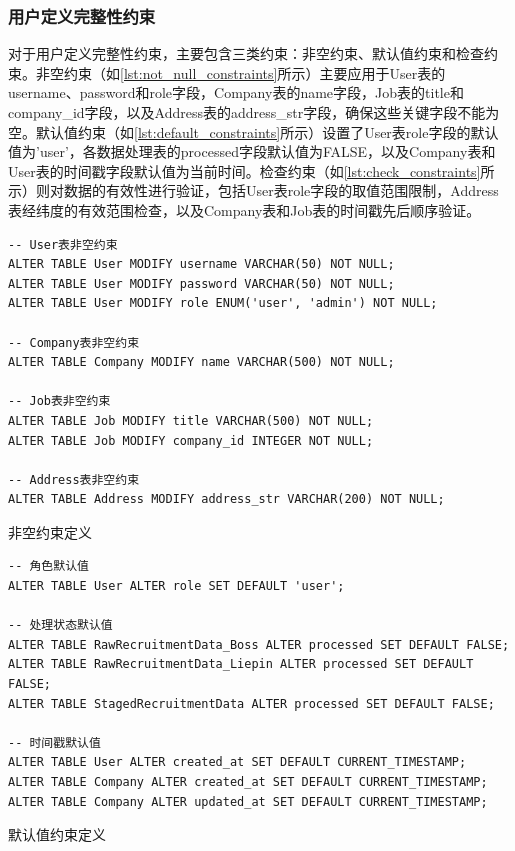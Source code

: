 \subsubsection{用户定义完整性约束}
对于用户定义完整性约束，主要包含三类约束：非空约束、默认值约束和检查约束。非空约束（如\cref{lst:not_null_constraints}所示）主要应用于User表的username、password和role字段，Company表的name字段，Job表的title和company\_id字段，以及Address表的address\_str字段，确保这些关键字段不能为空。默认值约束（如\cref{lst:default_constraints}所示）设置了User表role字段的默认值为'user'，各数据处理表的processed字段默认值为FALSE，以及Company表和User表的时间戳字段默认值为当前时间。检查约束（如\cref{lst:check_constraints}所示）则对数据的有效性进行验证，包括User表role字段的取值范围限制，Address表经纬度的有效范围检查，以及Company表和Job表的时间戳先后顺序验证。

\begin{listing}[htbp]
    \begin{verbatim}
-- User表非空约束
ALTER TABLE User MODIFY username VARCHAR(50) NOT NULL;
ALTER TABLE User MODIFY password VARCHAR(50) NOT NULL;
ALTER TABLE User MODIFY role ENUM('user', 'admin') NOT NULL;

-- Company表非空约束
ALTER TABLE Company MODIFY name VARCHAR(500) NOT NULL;

-- Job表非空约束
ALTER TABLE Job MODIFY title VARCHAR(500) NOT NULL;
ALTER TABLE Job MODIFY company_id INTEGER NOT NULL;

-- Address表非空约束
ALTER TABLE Address MODIFY address_str VARCHAR(200) NOT NULL;
    \end{verbatim}
    \caption{非空约束定义}\label{lst:not_null_constraints}
  \end{listing}

\begin{listing}[htbp]
    \begin{verbatim}
-- 角色默认值
ALTER TABLE User ALTER role SET DEFAULT 'user';

-- 处理状态默认值
ALTER TABLE RawRecruitmentData_Boss ALTER processed SET DEFAULT FALSE;
ALTER TABLE RawRecruitmentData_Liepin ALTER processed SET DEFAULT FALSE;
ALTER TABLE StagedRecruitmentData ALTER processed SET DEFAULT FALSE;

-- 时间戳默认值
ALTER TABLE User ALTER created_at SET DEFAULT CURRENT_TIMESTAMP;
ALTER TABLE Company ALTER created_at SET DEFAULT CURRENT_TIMESTAMP;
ALTER TABLE Company ALTER updated_at SET DEFAULT CURRENT_TIMESTAMP;
    \end{verbatim}
    \caption{默认值约束定义}\label{lst:default_constraints}
  \end{listing}

